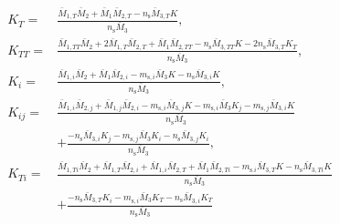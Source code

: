 \documentclass[english]{../thermomemo/thermomemo}
\newcommand{\seg}{\ensuremath{\text{s}}\xspace}
\begin{document}
\begin{align}
  \label{eq:K_diff_ordered}
  K_T =& \frac{\bar{M}_{1,T}\bar{M}_{2} + \bar{M}_{1}\bar{M}_{2,T} - n_\seg \bar{M}_{3,T} K}{n_\seg \bar{M}_{3}},\\
  K_{TT} =& \frac{\bar{M}_{1,TT}\bar{M}_{2} + 2 \bar{M}_{1,T}\bar{M}_{2,T} + \bar{M}_{1}\bar{M}_{2,TT} - n_\seg \bar{M}_{3,TT} K - 2 n_\seg \bar{M}_{3,T} K_T}{n_\seg \bar{M}_{3}},\\
  K_{i} =& \frac{\bar{M}_{1,i}\bar{M}_{2} + \bar{M}_{1}\bar{M}_{2,i} - m_{\seg,i} \bar{M}_{3} K - n_\seg \bar{M}_{3,i} K }{n_\seg \bar{M}_{3}} ,\\
  K_{ij} =& \frac{\bar{M}_{1,i}\bar{M}_{2,j} + \bar{M}_{1,j}\bar{M}_{2,i}  - m_{\seg,i} \bar{M}_{3,j} K - m_{\seg,i} \bar{M}_{3} K_{j} - m_{\seg,j} \bar{M}_{3,i} K }{n_\seg \bar{M}_{3}} \nonumber \\
  &+ \frac{ - n_\seg \bar{M}_{3,i} K_{j} - m_{\seg,j} \bar{M}_{3} K_{i} - n_\seg \bar{M}_{3,j} K_{i}}{n_\seg \bar{M}_{3}},\\
  K_{Ti} =& \frac{\bar{M}_{1,Ti}\bar{M}_{2} + \bar{M}_{1,T}\bar{M}_{2,i} + \bar{M}_{1,i}\bar{M}_{2,T} + \bar{M}_{1}\bar{M}_{2,Ti} - m_{\seg.i} \bar{M}_{3,T} K - n_{\seg} \bar{M}_{3,Ti} K}{n_{\seg} \bar{M}_{3}} \nonumber \\
  & + \frac{ - n_{\seg} \bar{M}_{3,T} K_i - m_{\seg,i} \bar{M}_{3} K_{T} - n_{\seg} \bar{M}_{3,i} K_{T}}{n_{\seg} \bar{M}_{3}}
\end{align}
\end{document}
